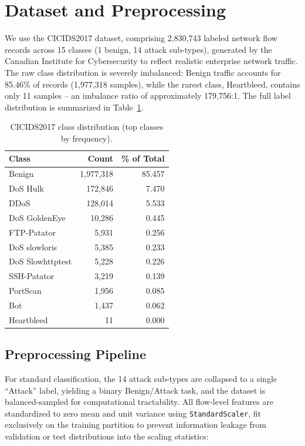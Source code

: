 \documentclass[11pt]{article}
\begin{document}
\section{Dataset and Preprocessing}
\label{sec:dataset}

We use the CICIDS2017 dataset, comprising 2{,}830{,}743 labeled network flow records across 15
classes (1 benign, 14 attack sub-types), generated by the Canadian Institute for Cybersecurity to
reflect realistic enterprise network traffic. The raw class distribution is severely imbalanced:
Benign traffic accounts for 85.46\% of records (1{,}977{,}318 samples), while the rarest class,
Heartbleed, contains only 11 samples -- an imbalance ratio of approximately 179{,}756:1. The full
label distribution is summarized in Table~\ref{tab:classdist}.

\begin{table}[h]
\centering
\caption{CICIDS2017 class distribution (top classes by frequency).}
\label{tab:classdist}
\begin{tabular}{lrr}
\toprule
Class & Count & \% of Total \\
\midrule
Benign & 1{,}977{,}318 & 85.457 \\
DoS Hulk & 172{,}846 & 7.470 \\
DDoS & 128{,}014 & 5.533 \\
DoS GoldenEye & 10{,}286 & 0.445 \\
FTP-Patator & 5{,}931 & 0.256 \\
DoS slowloris & 5{,}385 & 0.233 \\
DoS Slowhttptest & 5{,}228 & 0.226 \\
SSH-Patator & 3{,}219 & 0.139 \\
PortScan & 1{,}956 & 0.085 \\
Bot & 1{,}437 & 0.062 \\
Heartbleed & 11 & 0.000 \\
\bottomrule
\end{tabular}
\end{table}

\subsection{Preprocessing Pipeline}

For standard classification, the 14 attack sub-types are collapsed to a single ``Attack'' label,
yielding a binary Benign/Attack task, and the dataset is balanced-sampled for computational
tractability. All flow-level features are standardized to zero mean and unit variance using
\texttt{StandardScaler}, fit exclusively on the training partition to prevent information leakage
from validation or test distributions into the scaling statistics:
\end{document}
